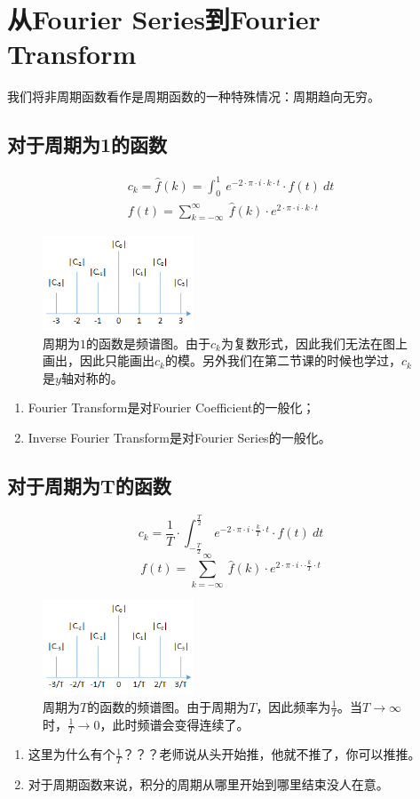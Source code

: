 \section{从Fourier Series到Fourier Transform}
我们将非周期函数看作是周期函数的一种特殊情况：周期趋向无穷。
\subsection{对于周期为1的函数}
\begin{align*}
	c_k=\hat{f}(k)=\int_0^1\ e^{-2\cdot \pi\cdot i\cdot k\cdot t}\cdot f(t)\ dt \\
	f(t)=\sum\limits_{k=-\infty}^{\infty}\ \hat{f}(k)\cdot e^{2\cdot \pi\cdot i\cdot k\cdot t}
\end{align*}
\begin{figure}[H]
	\centering
	\includegraphics[width=0.4\textwidth]{assets/ft1.png}
	\caption{周期为$1$的函数是频谱图。由于$c_k$为复数形式，因此我们无法在图上画出，因此只能画出$c_k$的模。另外我们在第二节课的时候也学过，$c_k$是$y$轴对称的。}
\end{figure}
\begin{enumerate}
	\item Fourier Transform是对Fourier Coefficient的一般化；
	\item Inverse Fourier Transform是对Fourier Series的一般化。
\end{enumerate}
\subsection{对于周期为T的函数}
$$
	c_k=\frac{1}{T}\cdot \int_{-\frac{T}{2}}^{\frac{T}{2}}\ e^{-2\cdot \pi\cdot i\cdot \frac{k}{T}\cdot t}\cdot f(t)\ dt
$$
$$
	f(t)=\sum\limits_{k=-\infty}^{\infty}\ \hat{f}(k)\cdot e^{2\cdot \pi\cdot i\cdot\cdot  \frac{k}{T}\cdot t}
$$

\begin{figure}[H]
	\centering
	\includegraphics[width=0.4\textwidth]{assets/ft2.png}
	\caption{周期为$T$的函数的频谱图。由于周期为$T$，因此频率为$\frac{1}{T}$。当$T\rightarrow\infty$时，$\frac{1}{T}\rightarrow 0$，此时频谱会变得连续了。}
\end{figure}
\begin{enumerate}
	\item 这里为什么有个$\frac{1}{T}$？？？老师说从头开始推，他就不推了，你可以推推。
	\item 对于周期函数来说，积分的周期从哪里开始到哪里结束没人在意。
\end{enumerate}
